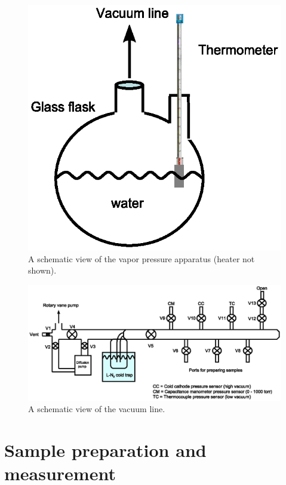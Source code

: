 \documentclass[byrevtex,amssymb,aps,pra,floatfix,letterpaper]{revtex4}
\begin{document}
\begin{figure}[!htp]
\begin{center}
\includegraphics[scale=0.5]{fig1}
\caption{A schematic view of the vapor pressure apparatus (heater not shown).}
\label{fig1}
\end{center}
\end{figure}

\begin{figure}[!htp]
\begin{center}
\includegraphics[scale=0.6]{fig2}
\caption{A schematic view of the vacuum line.}
\label{fig2}
\end{center}
\end{figure}

\section{Sample preparation and measurement}
\end{document}
